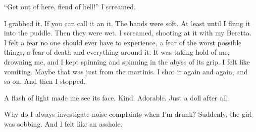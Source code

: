 ``Get out of here, fiend of hell!'' I screamed.



I grabbed it. If you can call it an it. The hands were soft. At
least until I flung it into the puddle. Then they were wet. I
screamed, shooting at it with my Beretta. I felt a fear no one
should ever have to experience, a fear of the worst possible
things, a fear of death and everything around it. It was taking
hold of me, drowning me, and I kept spinning and spinning in the
abyss of its grip. I felt like vomiting. Maybe that was just from
the martinis. I shot it again and again, and so on. And then I
stopped.



A flash of light made me see its face. Kind. Adorable. Just a doll
after all.



Why do I always investigate noise complaints when I'm drunk?
Suddenly, the girl was sobbing. And I felt like an asshole. 

 



